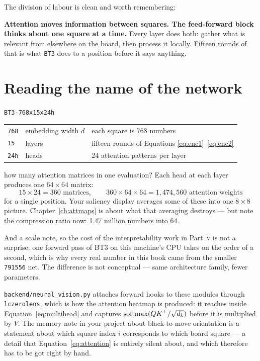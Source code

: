 The division of labour is clean and worth remembering:

\begin{keyidea}
\textbf{Attention moves information between squares. The feed-forward block thinks about one
square at a time.} Every layer does both: gather what is relevant from elsewhere on the board,
then process it locally. Fifteen rounds of that is what \texttt{BT3} does to a position before
it says anything.
\end{keyidea}

\section{Reading the name of the network}

\begin{center}
\texttt{BT3-768x15x24h}
\end{center}

\begin{center}
\begin{tabular}{@{}lll@{}}
\toprule
\texttt{768} & embedding width $d$ & each square is 768 numbers \\
\texttt{15}  & layers & fifteen rounds of Equations \eqref{eq:enc1}--\eqref{eq:enc2} \\
\texttt{24h} & heads & 24 attention patterns per layer \\
\bottomrule
\end{tabular}
\end{center}

\begin{worked}{how many attention matrices in one evaluation?}
Each head at each layer produces one $64\times64$ matrix:
\[
  15 \times 24 = 360 \text{ matrices}, \qquad 360 \times 64 \times 64 = 1{,}474{,}560
  \text{ attention weights}
\]
for a single position. Your saliency display averages some of these into one $8\times8$
picture. Chapter~\ref{ch:attmaps} is about what that averaging destroys --- but note the
compression ratio now: 1.47 million numbers into 64.
\end{worked}

And a scale note, so the cost of the interpretability work in Part~\textsc{v} is not a
surprise: one forward pass of BT3 on this machine's CPU takes on the order of a second, which
is why every real number in this book came from the smaller \texttt{791556} net. The
difference is not conceptual --- same architecture family, fewer parameters.

\begin{repobox}[title={in this repository}]
\texttt{backend/neural\_vision.py} attaches forward hooks to these modules through
\texttt{lczerolens}, which is how the attention heatmap is produced: it reaches inside
Equation~\eqref{eq:multihead} and captures $\operatorname{softmax}(QK^\top/\sqrt{d_k})$ before it is
multiplied by $V$. The memory note in your project about black-to-move orientation is a
statement about which square index $i$ corresponds to which board square --- a detail that
Equation~\eqref{eq:attention} is entirely silent about, and which therefore has to be got
right by hand.
\end{repobox}

